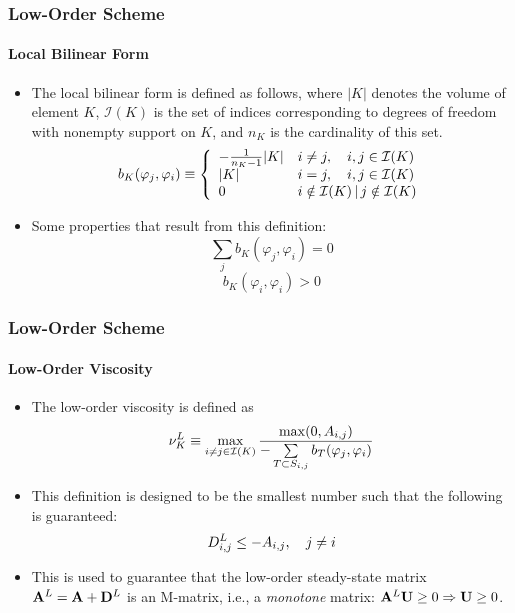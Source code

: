 \documentclass{beamer}
\begin{document}
\begin{frame}
\frametitle{Low-Order Scheme}
\framesubtitle{Local Bilinear Form}

\begin{itemize}
   \item The local bilinear form is defined as follows, where $|K|$ denotes
      the volume of element $K$, $\mathcal{I}(K)$ is the set of indices
      corresponding to degrees of freedom with nonempty support on $K$, and
      $n_K$ is the cardinality of this set.
   \begin{equation}
      b_K(\varphi_j, \varphi_i) \equiv \left\{\begin{array}{l l}
         -\frac{1}{n_K - 1}|K| & i\ne j, \quad i,j\in \mathcal{I}(K)\\
         |K|                   & i = j,  \quad i,j\in \mathcal{I}(K)\\
         0                     & i\notin\mathcal{I}(K)\,|\, j\notin\mathcal{I}(K)
      \end{array}\right.
   \end{equation}
   \item Some properties that result from this definition:
   \begin{equation}
      \sum\limits_j b_K(\varphi_j, \varphi_i) = 0
   \end{equation}
   \begin{equation}
      b_K(\varphi_i, \varphi_i) > 0
   \end{equation}
\end{itemize}

\end{frame}
\begin{frame}
\frametitle{Low-Order Scheme}
\framesubtitle{Low-Order Viscosity}

\begin{itemize}
   \item The low-order viscosity is defined as
   \begin{equation}
      \nu_K^L \equiv \max\limits_{i\ne j\in \mathcal{I}(K)}\frac{\max(0,A_{i,j})}
      {-\sum\limits_{T\subset S_{i,j}} b_T(\varphi_j, \varphi_i)}
   \end{equation}
   \item This definition is designed to be the smallest number such that the
      following is guaranteed:
   \begin{equation}
      D^L_{i,j} \leq -A_{i,j}, \quad j\ne i
   \end{equation}
   \item This is used to guarantee that the low-order steady-state matrix
      $\mathbf{A}^L=\mathbf{A}+\mathbf{D}^L$ is an M-matrix, i.e., a \emph{monotone} matrix:
      $\mathbf{A}^L\mathbf{U} \ge 0\Rightarrow \mathbf{U}\ge 0$.
\end{itemize}

\end{frame}
\end{document}
